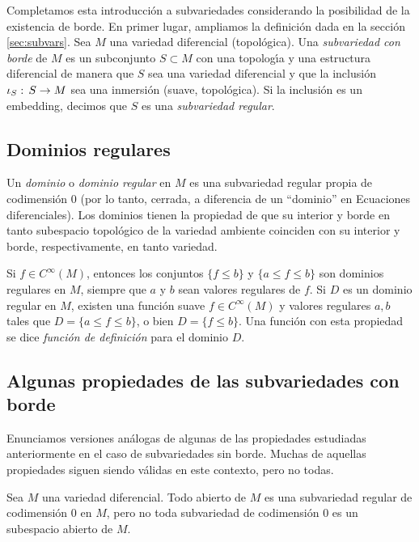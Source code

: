 \theoremstyle{plain}

\theoremstyle{remark}


Completamos esta introducci\'{o}n a subvariedades considerando la posibilidad
de la existencia de borde. En primer lugar, ampliamos la definici\'{o}n
dada en la secci\'{o}n \ref{sec:subvars}. Sea $M$ una variedad diferencial
(topol\'{o}gica). Una \emph{subvariedad con borde} de $M$ es un subconjunto
$S\subset M$ con una topolog\'{\i}a y una estructura diferencial de manera
que $S$ sea una variedad diferencial y que la inclusi\'{o}n
$\inc[S]:\,S\rightarrow M$ sea una inmersi\'{o}n (suave, topol\'{o}gica).
Si la inclusi\'{o}n es un embedding, decimos que $S$ es una \emph{subvariedad %
regular}.

\subsection{Dominios regulares}
Un \emph{dominio} o \emph{dominio regular} en $M$ es una subvariedad regular
propia de codimensi\'{o}n $0$ (por lo tanto, cerrada, a diferencia de un
``dominio'' en Ecuaciones diferenciales). Los dominios tienen la propiedad de
que su interior y borde en tanto subespacio topol\'{o}gico de la variedad
ambiente coinciden con su interior y borde, respectivamente, en tanto
variedad.

Si $f\in C^{\infty}(M)$, entonces los conjuntos $\{f\leq b\}$ y
$\{a\leq f\leq b\}$ son dominios regulares en $M$, siempre que $a$ y $b$ sean
valores regulares de $f$. Si $D$ es un dominio regular en $M$, existen una
funci\'{o}n suave $f\in C^{\infty}(M)$ y valores regulares $a,b$ tales que
$D=\{a\leq f\leq b\}$, o bien $D=\{f\leq b\}$. Una funci\'{o}n con esta
propiedad se dice \emph{funci\'{o}n de definici\'{o}n} para el dominio $D$.

\subsection{Algunas propiedades de las subvariedades con borde}
Enunciamos versiones an\'{a}logas de algunas de las propiedades estudiadas
anteriormente en el caso de subvariedades sin borde. Muchas de aquellas
propiedades siguen siendo v\'{a}lidas en este contexto, pero no todas.

Sea $M$ una variedad diferencial. Todo abierto de $M$ es una subvariedad
regular de codimensi\'{o}n $0$ en $M$, pero no toda subvariedad de
codimensi\'{o}n $0$ es un subespacio abierto de $M$.

